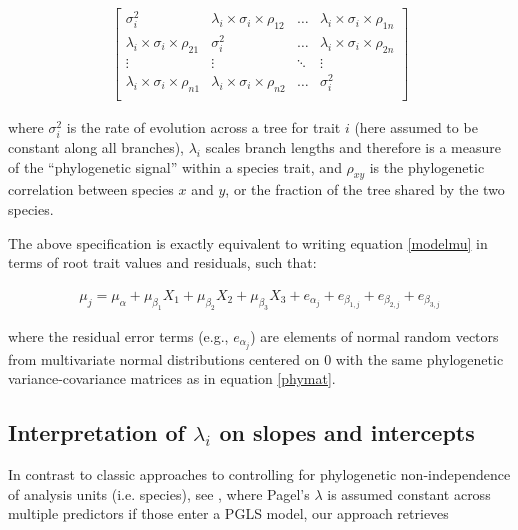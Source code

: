 \documentclass{article}\usepackage[]{graphicx}\usepackage[]{color}
\begin{document}
\begin{align}
  \label{phymat}
\begin{bmatrix}
  \sigma^2_i & \lambda_i \times \sigma_{i} \times \rho_{12} & \ldots & \lambda_i \times \sigma_{i} \times \rho_{1n} \\
  \lambda_i \times \sigma_i \times \rho_{21} & \sigma^2_i & \ldots & \lambda_i \times \sigma_{i} \times \rho_{2n} \\
  \vdots & \vdots & \ddots & \vdots \\
  \lambda_i \times \sigma_i \times \rho_{n1} & \lambda_i \times \sigma_i \times \rho_{n2} & \ldots & \sigma^2_i \\
\end{bmatrix}
\end{align}

\noindent where $\sigma_i^2$ is the rate of evolution across a tree for trait $i$ (here assumed to be constant along all branches), $\lambda_i$ scales branch lengths and therefore is a measure of the ``phylogenetic signal'' within a species trait, and $\rho_{xy}$ is the phylogenetic correlation between species $x$ and $y$, or the fraction of the tree shared by the two species.

The above specification is exactly equivalent to writing equation \ref{modelmu} in terms of root trait values and residuals, such that:

\begin{align}
  \mu_j = \mu_\alpha + \mu_{\beta_1} X_1 + \mu_{\beta_2} X_2 + \mu_{\beta_3} X_3 + e_{\alpha_{j}} + e_{\beta_{1,j}} + e_{\beta_{2,j}} + e_{\beta_{3,j}}
\end{align}

\noindent where the residual error terms (e.g., $e_{\alpha_{j}}$) are elements of normal random vectors from multivariate normal distributions centered on $0$ with the same phylogenetic variance-covariance matrices as in equation \ref{phymat}.


\subsection*{Interpretation of $\lambda_i$ on slopes and intercepts}


In contrast to classic approaches to controlling for phylogenetic non-independence of analysis units (i.e. species), see \citep{freckleton2002phylogenetic}, where Pagel's \cite{pagel1999inferring} $\lambda$ is assumed constant across multiple predictors if those enter a PGLS model, our approach retrieves 
\end{document}
